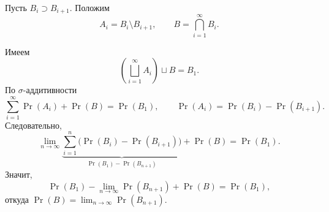 \begin{Proof}[$1\implies3$]
    Пусть $B_i\supset B_{i+1}$. Положим
    \[
        A_i=B_i\setminus B_{i+1},
        \qquad B=\bigcap_{i=1}^{\infty}B_i.
    \]
    \begin{center}
    \end{center}
    Имеем
    \[
        \left(\bigsqcup_{i=1}^{\infty}A_i\right)\sqcup B=B_1.
    \]
    По $\sigma$-аддитивности
    \[
        \sum_{i=1}^{\infty}\Pr(A_i)+\Pr(B)=\Pr(B_1),
        \qquad \Pr(A_i)=\Pr(B_i)-\Pr(B_{i+1}).
    \]
    Следовательно,
    \[
        \lim_{n\to\infty}
        \underbrace{\sum_{i=1}^{n}
        \bigl(\Pr(B_i)-\Pr(B_{i+1})\bigr)}
        _{\Pr(B_1)-\Pr(B_{n+1})}
        +\Pr(B)=\Pr(B_1).
    \]
    Значит,
    \[
        \Pr(B_1)-\lim_{n\to\infty}\Pr(B_{n+1})
        +\Pr(B)=\Pr(B_1),
    \]
    откуда $\Pr(B)=\lim_{n\to\infty}\Pr(B_{n+1})$.
\end{Proof}
